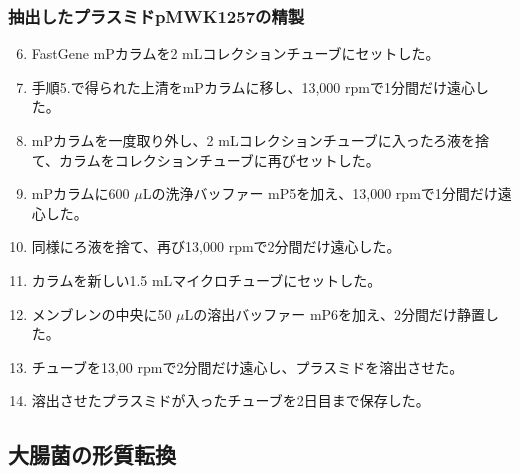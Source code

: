 \documentclass[paper=a4, head_space=20mm, foot_space=25mm]{jlreq}
\begin{document}
            \subsubsection*{抽出したプラスミドpMWK1257の精製}
                \begin{enumerate}
                    \setcounter{enumi}{5}
                    \item FastGene\texttrademark{} mPカラムを2 mLコレクションチューブにセットした。
                    \item 手順5.で得られた上清をmPカラムに移し、13,000 rpmで1分間だけ遠心した。
                    \item mPカラムを一度取り外し、2 mLコレクションチューブに入ったろ液を捨て、カラムをコレクションチューブに再びセットした。
                    \item mPカラムに600 $\mu$Lの洗浄バッファー mP5を加え、13,000 rpmで1分間だけ遠心した。
                    \item 同様にろ液を捨て、再び13,000 rpmで2分間だけ遠心した。
                    \item カラムを新しい1.5 mLマイクロチューブにセットした。
                    \item メンブレンの中央に50 $\mu$Lの溶出バッファー mP6を加え、2分間だけ静置した。
                    \item チューブを13,00 rpmで2分間だけ遠心し、プラスミドを溶出させた。
                    \item 溶出させたプラスミドが入ったチューブを2日目まで保存した。
                \end{enumerate}

        \subsection{大腸菌の形質転換}
\end{document}
